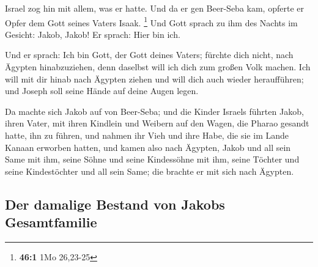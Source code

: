  Israel zog hin mit allem, was er hatte. Und da er gen
Beer-Seba kam, opferte er Opfer dem Gott seines Vaters Isaak.
\footnote{\textbf{46:1} 1Mo 26,23-25}  Und Gott sprach zu
ihm des Nachts im Gesicht: Jakob, Jakob! Er sprach: Hier bin ich.

 Und er sprach: Ich bin Gott, der Gott deines Vaters;
fürchte dich nicht, nach Ägypten hinabzuziehen, denn daselbst will ich
dich zum großen Volk machen.  Ich will mit dir hinab nach
Ägypten ziehen und will dich auch wieder heraufführen; und Joseph soll
seine Hände auf deine Augen legen.

 Da machte sich Jakob auf von Beer-Seba; und die Kinder
Israels führten Jakob, ihren Vater, mit ihren Kindlein und Weibern auf
den Wagen, die Pharao gesandt hatte, ihn zu führen,  und
nahmen ihr Vieh und ihre Habe, die sie im Lande Kanaan erworben hatten,
und kamen also nach Ägypten, Jakob und all sein Same mit ihm,
 seine Söhne und seine Kindessöhne mit ihm, seine Töchter
und seine Kindestöchter und all sein Same; die brachte er mit sich nach
Ägypten.

\hypertarget{der-damalige-bestand-von-jakobs-gesamtfamilie}{%
\subsection{Der damalige Bestand von Jakobs
Gesamtfamilie}\label{der-damalige-bestand-von-jakobs-gesamtfamilie}}

